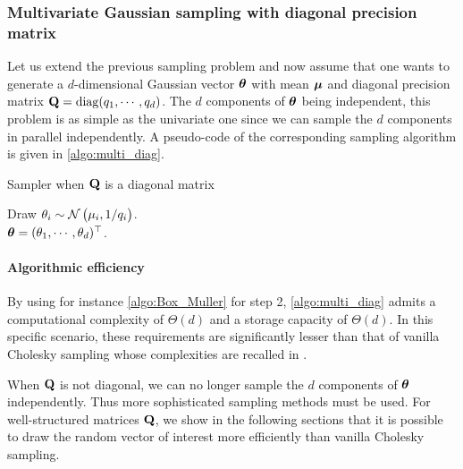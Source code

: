 \documentclass[nohypdvips,onefignum,onetabnum]{siamart171218}
\begin{document}
\subsubsection{Multivariate Gaussian sampling with diagonal precision matrix}
Let us extend the previous sampling problem and now assume that one wants to generate a $d$-dimensional Gaussian vector $\boldsymbol{\theta}$ with mean $\boldsymbol{\mu}$ and diagonal precision matrix $\mathbf{Q} = \mathrm{diag}(q_1,\cdots,q_d)$.
The $d$ components of $\boldsymbol{\theta}$ being independent, this problem is as simple as the univariate one since we can sample the $d$ components in parallel independently.
A pseudo-code of the corresponding sampling algorithm is given in \cref{algo:multi_diag}.
\begin{algorithm}
  \caption{Sampler when $\mathbf{Q}$ is a diagonal matrix}
  \label{algo:multi_diag}
  \begin{algorithmic}[1]
     \Comment{\textcolor{green}{In some programming languages, this loop can be vectorized.}} 
    \State Draw $\displaystyle{\theta_i \sim \mathcal{N}\left(\mu_i,1/q_i\right)}$.
    \EndFor\\
    \Return $\boldsymbol{\theta} = (\theta_1,\cdots,\theta_d)^{\top}$.
  \end{algorithmic}
\end{algorithm}

\paragraph{Algorithmic efficiency}
By using for instance \cref{algo:Box_Muller} for step 2, \cref{algo:multi_diag} admits a computational complexity of $\Theta(d)$ and a storage capacity of $\Theta(d)$.
In this specific scenario, these requirements are significantly lesser than that of vanilla Cholesky sampling whose complexities are recalled in .

When $\mathbf{Q}$ is not diagonal, we can no longer sample the $d$ components of $\boldsymbol{\theta}$ independently.
Thus more sophisticated sampling methods must be used. 
For well-structured matrices $\mathbf{Q}$, we show in the following sections that it is possible to draw the random vector of interest more efficiently than vanilla Cholesky sampling.
\end{document}
